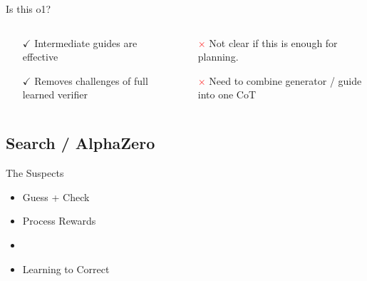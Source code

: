 \documentclass[14pt,aspectratio=169]{beamer}
\begin{document}
\begin{frame}{Is this o1?}
	\begin{columns}
		\begin{column}{0.5\linewidth}
			\begin{itemize}
				\item[$\boldsymbol{\checkmark}$] Intermediate guides are effective
				\item[$\boldsymbol{\checkmark}$] Removes challenges of full learned verifier
			\end{itemize}
		\end{column}
		\begin{column}{0.5\linewidth}
			\begin{itemize}
				\item[\textcolor{red}{$\boldsymbol{\times}$}] Not clear if this is enough for planning.
				\item[\textcolor{red}{$\boldsymbol{\times}$}] Need to combine generator / guide into one CoT
			\end{itemize}
		\end{column}
	\end{columns}
\end{frame}



\subsection{Search / AlphaZero}
\begin{frame}{The Suspects}
	\begin{itemize}
		\item Guess + Check
		\item Process Rewards
		\item {}
		\item Learning to Correct
	\end{itemize}
\end{frame}
\end{document}
